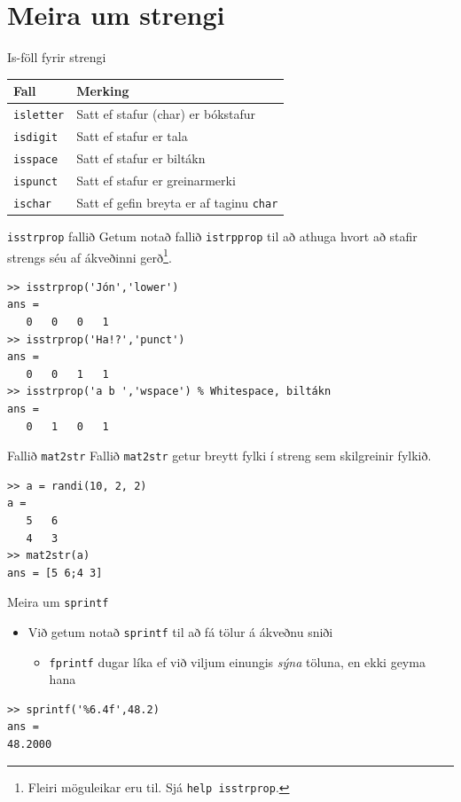 \documentclass{beamer}
\begin{document}
\section{Meira um strengi}

\begin{frame}[fragile]{Is-föll fyrir strengi}
\begin{center}
\begin{tabular}{ll}
\toprule
Fall&Merking\\
\midrule
\texttt{isletter}&Satt ef stafur (char) er bókstafur\\
\texttt{isdigit}&Satt ef stafur er tala\\
\texttt{isspace}&Satt ef stafur er biltákn\\
\texttt{ispunct}&Satt ef stafur er greinarmerki\\
\texttt{ischar}&Satt ef gefin breyta er af taginu \texttt{char}\\
\bottomrule
\end{tabular}
\end{center}
\end{frame}

\begin{frame}[fragile]{\texttt{isstrprop} fallið}
\vspace{1.5\baselineskip}
Getum notað fallið \texttt{istrpprop} til að athuga hvort að stafir strengs séu af ákveðinni gerð\footnote{Fleiri möguleikar eru til. Sjá \texttt{help isstrprop}.}.
\begin{verbatim}
>> isstrprop('Jón','lower')
ans =
   0   0   0   1
>> isstrprop('Ha!?','punct')
ans =
   0   0   1   1
>> isstrprop('a b ','wspace') % Whitespace, biltákn
ans =
   0   1   0   1
\end{verbatim}
\end{frame}

\begin{frame}[fragile]{Fallið \texttt{mat2str}}
Fallið \texttt{mat2str} getur breytt fylki í streng sem skilgreinir fylkið.
\begin{verbatim}
>> a = randi(10, 2, 2)
a =
   5   6
   4   3
>> mat2str(a)
ans = [5 6;4 3]
\end{verbatim}
\end{frame}

\begin{frame}[fragile]{Meira um \texttt{sprintf}}
\begin{itemize}
 \item Við getum notað \texttt{sprintf} til að fá tölur á ákveðnu sniði
 \begin{itemize}
  \item \texttt{fprintf} dugar líka ef við viljum einungis \emph{sýna} töluna, en ekki geyma hana
 \end{itemize}
\end{itemize}
\begin{verbatim}
>> sprintf('%6.4f',48.2)
ans =
48.2000
\end{verbatim}
\end{frame}
\end{document}
